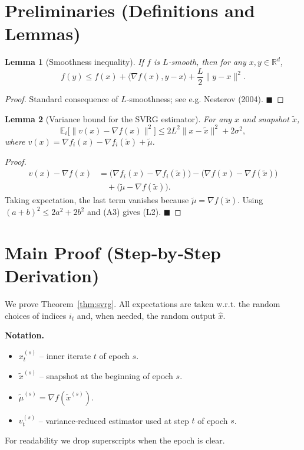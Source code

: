 \documentclass{article}
\newtheorem{lemma}{Lemma}
\newcommand{\E}{\mathbb{E}}
\newcommand{\R}{\mathbb{R}}
\begin{document}
\section*{Preliminaries (Definitions and Lemmas)}
\begin{lemma}[Smoothness inequality]\label{lem:smooth}
If $f$ is $L$‑smooth, then for any $x,y\in\R^{d}$,
\[
f(y)\le f(x)+\langle\nabla f(x),y-x\rangle+\frac{L}{2}\|y-x\|^{2}. \tag{L1}
\]
\end{lemma}
\begin{proof}
Standard consequence of $L$‑smoothness; see e.g. Nesterov (2004). \hfill$\blacksquare$
\end{proof}

\begin{lemma}[Variance bound for the SVRG estimator]\label{lem:var}
For any $x$ and snapshot $\tilde{x}$,
\[
\E_{i}\!\big[\|v(x)-\nabla f(x)\|^{2}\big]
\le 2L^{2}\|x-\tilde{x}\|^{2}+2\sigma^{2}, \tag{L2}
\]
where $v(x)=\nabla f_i(x)-\nabla f_i(\tilde{x})+\tilde{\mu}$.
\end{lemma}
\begin{proof}
\[
\begin{aligned}
v(x)-\nabla f(x) 
&= \big(\nabla f_i(x)-\nabla f_i(\tilde{x})\big)
   -\big(\nabla f(x)-\nabla f(\tilde{x})\big)\\
&\quad +\big(\tilde{\mu}-\nabla f(\tilde{x})\big).
\end{aligned}
\]
Taking expectation, the last term vanishes because $\tilde{\mu}=\nabla f(\tilde{x})$.
Using $(a+b)^{2}\le2a^{2}+2b^{2}$ and (A3) gives (L2). \hfill$\blacksquare$
\end{proof}

\section*{Main Proof (Step‑by‑Step Derivation)}
We prove Theorem~\ref{thm:svrg}.  All expectations are taken w.r.t. the random choices of indices $i_t$ and, when needed, the random output $\hat{x}$.

\bigskip
\noindent\textbf{Notation.}
\begin{itemize}
\item $x_t^{(s)}$ – inner iterate $t$ of epoch $s$.
\item $\tilde{x}^{(s)}$ – snapshot at the beginning of epoch $s$.
\item $\tilde{\mu}^{(s)}=\nabla f(\tilde{x}^{(s)})$.
\item $v_t^{(s)}$ – variance‑reduced estimator used at step $t$ of epoch $s$.
\end{itemize}
For readability we drop superscripts when the epoch is clear.
\end{document}
